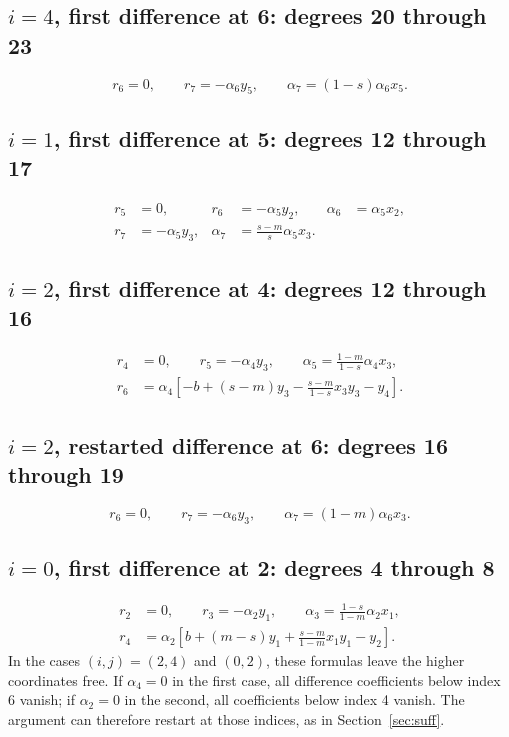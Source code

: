\subsection*{$i=4$, first difference at 6: degrees 20 through 23}
\[
 r_6=0,\qquad r_7=-\alpha_6y_5,\qquad
 \alpha_7=(1-s)\alpha_6x_5.
\]
\subsection*{$i=1$, first difference at 5: degrees 12 through 17}
\[
\begin{aligned}
 r_5&=0,&r_6&=-\alpha_5y_2,&\alpha_6&=\alpha_5x_2,\\
 r_7&=-\alpha_5y_3,&\alpha_7&=\frac{s-m}{s}\alpha_5x_3.
\end{aligned}
\]
\subsection*{$i=2$, first difference at 4: degrees 12 through 16}
\[
\begin{aligned}
 r_4&=0,\qquad r_5=-\alpha_4y_3,\qquad
 \alpha_5=\frac{1-m}{1-s}\alpha_4x_3,\\
 r_6&=\alpha_4\left[-b+(s-m)y_3-\frac{s-m}{1-s}x_3y_3-y_4\right].
\end{aligned}
\]
\subsection*{$i=2$, restarted difference at 6: degrees 16 through 19}
\[
 r_6=0,\qquad r_7=-\alpha_6y_3,\qquad
 \alpha_7=(1-m)\alpha_6x_3.
\]
\subsection*{$i=0$, first difference at 2: degrees 4 through 8}
\[
\begin{aligned}
 r_2&=0,\qquad r_3=-\alpha_2y_1,\qquad
 \alpha_3=\frac{1-s}{1-m}\alpha_2x_1,\\
 r_4&=\alpha_2\left[b+(m-s)y_1+\frac{s-m}{1-m}x_1y_1-y_2\right].
\end{aligned}
\]
In the cases $(i,j)=(2,4)$ and $(0,2)$, these formulas leave the higher
coordinates free. If $\alpha_4=0$ in the first case, all difference
coefficients below index 6 vanish; if $\alpha_2=0$ in the second, all
coefficients below index 4 vanish. The argument can therefore restart at
those indices, as in Section~\ref{sec:suff}.
